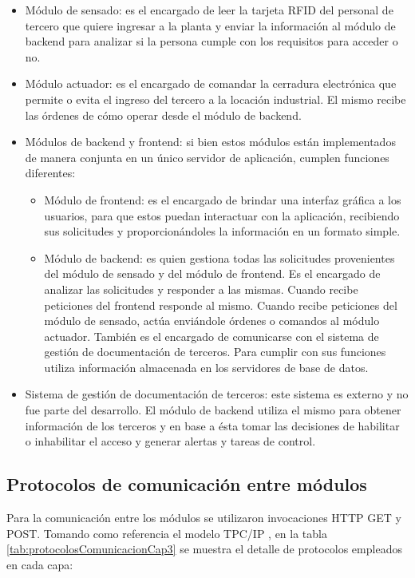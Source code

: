 \begin{itemize}
\item Módulo de sensado: es el encargado de leer la tarjeta RFID del personal de tercero que quiere ingresar a la planta y enviar la información al módulo de backend para analizar si la persona cumple con los requisitos para acceder o no.
\item Módulo actuador: es el encargado de comandar la cerradura electrónica que permite o evita el ingreso del tercero a la locación industrial. El mismo recibe las órdenes de cómo operar desde el módulo de backend.
\item Módulos de backend y frontend: si bien estos módulos están implementados de manera conjunta en un único servidor de aplicación, cumplen funciones diferentes:

	\begin{itemize}
	\item Módulo de frontend: es el encargado de brindar una interfaz gráfica a los usuarios, para que estos puedan interactuar con la aplicación, recibiendo sus solicitudes y proporcionándoles la información en un formato simple.
	\item Módulo de backend: es quien gestiona todas las solicitudes provenientes del módulo de sensado y del módulo de frontend. Es el encargado de analizar las solicitudes y responder a las mismas. Cuando recibe peticiones del frontend responde al mismo. Cuando recibe peticiones del módulo de sensado, actúa enviándole órdenes o comandos al módulo actuador. También es el encargado de comunicarse con el sistema de gestión de documentación de terceros. Para cumplir con sus funciones utiliza información almacenada en los servidores de base de datos.
	\end{itemize}
\item Sistema de gestión de documentación de terceros: este sistema es externo y no fue parte del desarrollo. El módulo de backend utiliza el mismo para obtener información de los terceros y en base a ésta tomar las decisiones de habilitar o inhabilitar el acceso y generar alertas y tareas de control.
\end{itemize}

\subsection{Protocolos de comunicación entre módulos}
Para la comunicación entre los módulos se utilizaron invocaciones HTTP GET y POST. 
Tomando como referencia el modelo TPC/IP \citep{WEBSITE:modeloTCPIP}, en la tabla \ref{tab:protocolosComunicacionCap3} se muestra el detalle de protocolos empleados en cada capa:


